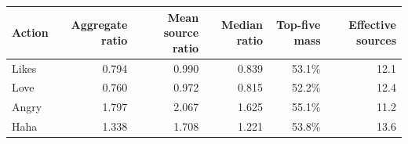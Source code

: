 \begin{tabular}{lrrrrr}
\toprule
Action & Aggregate ratio & Mean source ratio & Median ratio & Top-five mass & Effective sources \\
\midrule
Likes & 0.794 & 0.990 & 0.839 & 53.1\% & 12.1 \\
Love & 0.760 & 0.972 & 0.815 & 52.2\% & 12.4 \\
Angry & 1.797 & 2.067 & 1.625 & 55.1\% & 11.2 \\
Haha & 1.338 & 1.708 & 1.221 & 53.8\% & 13.6 \\
\bottomrule
\end{tabular}
